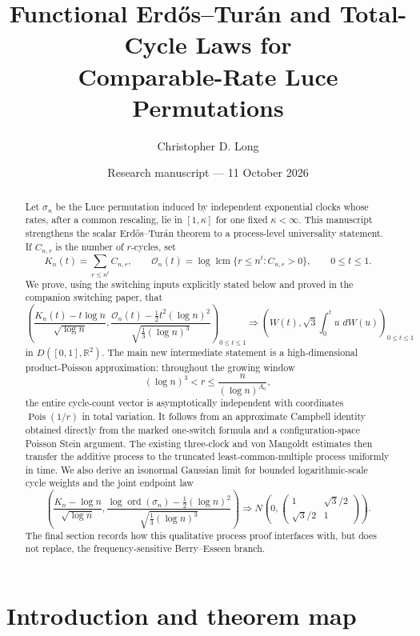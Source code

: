 \documentclass[11pt]{article}
\title{Functional Erd\H{o}s--Tur\'an and Total-Cycle Laws for\\
Comparable-Rate Luce Permutations}
\author{Christopher D. Long}
\date{Research manuscript --- 11 October 2026}
\theoremstyle{definition}
\theoremstyle{remark}
\newcommand{\dd}{\,d}
\newcommand{\Pois}{\operatorname{Pois}}
\newcommand{\ord}{\operatorname{ord}}
\newcommand{\lcm}{\operatorname{lcm}}
\newcommand{\cO}{\mathcal O}
\newcommand{\R}{\mathbb R}
\begin{document}
\maketitle

\begin{abstract}
Let $\sigma_n$ be the Luce permutation induced by independent exponential
clocks whose rates, after a common rescaling, lie in $[1,\kappa]$ for one
fixed $\kappa<\infty$.  This manuscript strengthens the scalar
Erd\H{o}s--Tur\'an theorem to a process-level universality statement.  If
$C_{n,r}$ is the number of $r$-cycles, set
\[
 K_n(t)=\sum_{r\le n^t}C_{n,r},
 \qquad
 \cO_n(t)=\log\lcm\{r\le n^t:C_{n,r}>0\},
 \qquad 0\le t\le1.
\]
We prove, using the switching inputs explicitly stated below and proved in
the companion switching paper, that
\[
 \left(
 \frac{K_n(t)-t\log n}{\sqrt{\log n}},
 \frac{\cO_n(t)-\frac12t^2(\log n)^2}
      {\sqrt{\frac13(\log n)^3}}
 \right)_{0\le t\le1}
 \Rightarrow
 \left(
 W(t),\sqrt3\int_0^t u\,\dd W(u)
 \right)_{0\le t\le1}
\]
in $D([0,1],\R^2)$.  The main new intermediate statement is a
high-dimensional product-Poisson approximation: throughout the growing
window
\[
 (\log n)^3<r\le \frac{n}{(\log n)^{A_0}},
\]
the entire cycle-count vector is asymptotically independent with coordinates
$\Pois(1/r)$ in total variation.  It follows from an approximate Campbell
identity obtained directly from the marked one-switch formula and a
configuration-space Poisson Stein argument.  The existing three-clock and
von Mangoldt estimates then transfer the additive process to the truncated
least-common-multiple process uniformly in time.  We also derive an
isonormal Gaussian limit for bounded logarithmic-scale cycle weights and the
joint endpoint law
\[
 \left(
 \frac{K_n-\log n}{\sqrt{\log n}},
 \frac{\log\ord(\sigma_n)-\frac12(\log n)^2}
      {\sqrt{\frac13(\log n)^3}}
 \right)
 \Rightarrow
 N\!\left(0,
 \begin{pmatrix}1&\sqrt3/2\\ \sqrt3/2&1\end{pmatrix}\right).
\]
The final section records how this qualitative process proof interfaces with,
but does not replace, the frequency-sensitive Berry--Esseen branch.
\end{abstract}

\tableofcontents

\section{Introduction and theorem map}
\end{document}
